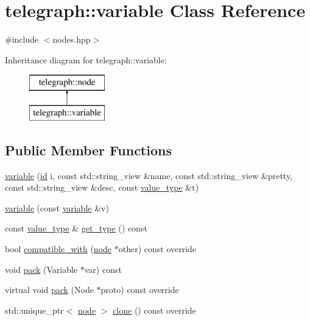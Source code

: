 \hypertarget{classtelegraph_1_1variable}{}\section{telegraph\+:\+:variable Class Reference}
\label{classtelegraph_1_1variable}


{\ttfamily \#include $<$nodes.\+hpp$>$}

Inheritance diagram for telegraph\+:\+:variable\+:\begin{figure}[H]
\begin{center}
\leavevmode
\includegraphics[height=2.000000cm]{classtelegraph_1_1variable}
\end{center}
\end{figure}
\subsection*{Public Member Functions}
\begin{DoxyCompactItemize}
\item 
\hyperlink{classtelegraph_1_1variable_a83fd573aea4f3377e067a2bad74a6fbf}{variable} (\hyperlink{classtelegraph_1_1node_a90bc576d668ed141d5354a06aa9c8d9a}{id} i, const std\+::string\+\_\+view \&name, const std\+::string\+\_\+view \&pretty, const std\+::string\+\_\+view \&desc, const \hyperlink{classtelegraph_1_1value__type}{value\+\_\+type} \&t)
\item 
\hyperlink{classtelegraph_1_1variable_a6fb4602379330bbafba7628f118a5238}{variable} (const \hyperlink{classtelegraph_1_1variable}{variable} \&v)
\item 
const \hyperlink{classtelegraph_1_1value__type}{value\+\_\+type} \& \hyperlink{classtelegraph_1_1variable_aa3df360c10cfa96a374374beaefbac2e}{get\+\_\+type} () const
\item 
bool \hyperlink{classtelegraph_1_1variable_a4075427712d7286318b8ee7bb8c207b8}{compatible\+\_\+with} (\hyperlink{classtelegraph_1_1node}{node} $\ast$other) const override
\item 
void \hyperlink{classtelegraph_1_1variable_a436e5ea79ef18757d58a65caeb795be6}{pack} (Variable $\ast$var) const
\item 
virtual void \hyperlink{classtelegraph_1_1variable_a3016d192f7d4328cf1f32273f9431d83}{pack} (Node $\ast$proto) const override
\item 
std\+::unique\+\_\+ptr$<$ \hyperlink{classtelegraph_1_1node}{node} $>$ \hyperlink{classtelegraph_1_1variable_a25d2ba4ae52c2bcad99a34b84ce7407b}{clone} () const override
\end{DoxyCompactItemize}
